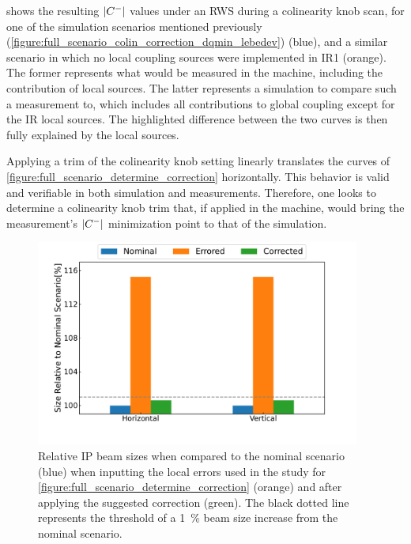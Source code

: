  shows the resulting \(\left\lvert C^{-} \right\rvert\) values under an RWS during a colinearity knob scan, for one of the simulation scenarios mentioned previously (\cref{figure:full_scenario_colin_correction_dqmin_lebedev}) (\textcolor{mplblue}{blue}), and a similar scenario in which no local coupling sources were implemented in IR\num{1} (\textcolor{mplorange}{orange}).
The former represents what would be measured in the machine, including the contribution of local sources.
The latter represents a simulation to compare such a measurement to, which includes all contributions to global coupling except for the IR local sources.
The highlighted difference between the two curves is then fully explained by the local sources.

Applying a trim of the colinearity knob setting linearly translates the curves of \cref{figure:full_scenario_determine_correction} horizontally.
This behavior is valid and verifiable in both simulation and measurements.
Therefore, one looks to determine a colinearity knob trim that, if applied in the machine, would bring the measurement's \(\left\lvert C^{-} \right\rvert\) minimization point to that of the simulation.

\begin{figure}[!htb]
    \centering
    \includegraphics*[width=0.95\textwidth]{Figures/IR_Coupling_Correction/full_scenario_correction_efficiency.pdf}
    \caption{Relative IP beam sizes when compared to the nominal scenario (\textcolor{mplblue}{blue}) when inputting the local errors used in the study for \cref{figure:full_scenario_determine_correction} (\textcolor{mplorange}{orange}) and after applying the suggested correction (\textcolor{mplgreen}{green}). The black dotted line represents the threshold of a \qty{1}{\percent} beam size increase from the nominal scenario.}
    \label{figure:full_scenario_correction_efficiency}
\end{figure}

